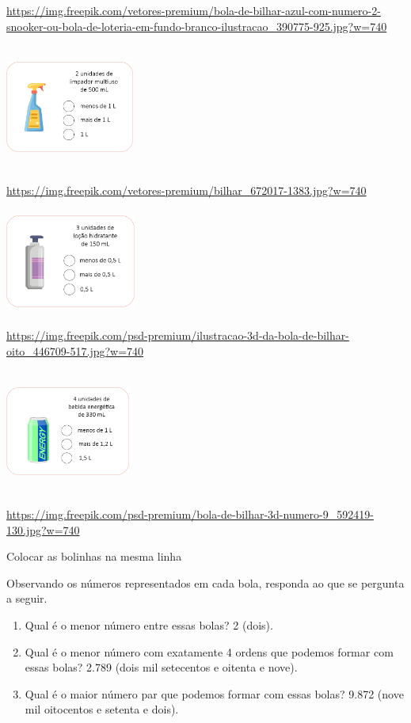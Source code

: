 \begin{enumerate}
\url{https://img.freepik.com/vetores-premium/bola-de-bilhar-azul-com-numero-2-snooker-ou-bola-de-loteria-em-fundo-branco-ilustracao_390775-925.jpg?w=740}

\includegraphics[width=1.66667in,height=1.61877in]{media/image22.png}

\url{https://img.freepik.com/vetores-premium/bilhar_672017-1383.jpg?w=740}

\includegraphics[width=1.68333in,height=1.36449in]{media/image23.png}

\url{https://img.freepik.com/psd-premium/ilustracao-3d-da-bola-de-bilhar-oito_446709-517.jpg?w=740}

\includegraphics[width=1.61667in,height=1.60236in]{media/image24.png}

\url{https://img.freepik.com/psd-premium/bola-de-bilhar-3d-numero-9_592419-130.jpg?w=740}

Colocar as bolinhas na mesma linha

Observando os números representados em cada bola, responda ao que se pergunta a seguir.

\begin{enumerate}
\def\labelenumi{\alph{enumi})}
\item
  Qual é o menor número entre essas bolas?
  2 (dois).
\item
  Qual é o menor número com exatamente 4 ordens que podemos formar com essas bolas?
  2.789 (dois mil setecentos e oitenta e nove).
\item
  Qual é o maior número par que podemos formar com essas bolas?
  9.872 (nove mil oitocentos e setenta e dois).
\end{enumerate}


\end{enumerate}
